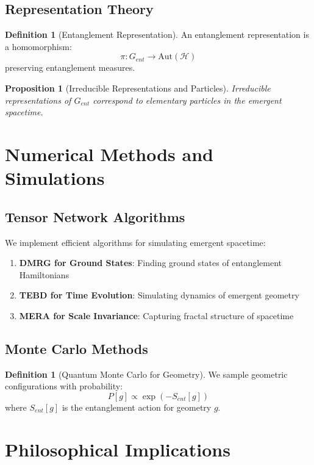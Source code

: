 \documentclass[12pt,a4paper]{article}
\newcommand{\Hilb}{\mathcal{H}}
\theoremstyle{plain}
\newtheorem{proposition}[theorem]{Proposition}
\theoremstyle{definition}
\newtheorem{definition}[theorem]{Definition}
\theoremstyle{remark}
\begin{document}
\subsection{Representation Theory}

\begin{definition}[Entanglement Representation]
An entanglement representation is a homomorphism:
\[\pi: G_{ent} \to \text{Aut}(\Hilb)\]
preserving entanglement measures.
\end{definition}

\begin{proposition}[Irreducible Representations and Particles]
Irreducible representations of $G_{ent}$ correspond to elementary particles in the emergent spacetime.
\end{proposition}

\section{Numerical Methods and Simulations}

\subsection{Tensor Network Algorithms}

We implement efficient algorithms for simulating emergent spacetime:

\begin{enumerate}
\item \textbf{DMRG for Ground States}: Finding ground states of entanglement Hamiltonians
\item \textbf{TEBD for Time Evolution}: Simulating dynamics of emergent geometry
\item \textbf{MERA for Scale Invariance}: Capturing fractal structure of spacetime
\end{enumerate}

\subsection{Monte Carlo Methods}

\begin{definition}[Quantum Monte Carlo for Geometry]
We sample geometric configurations with probability:
\[P[g] \propto \exp(-S_{ent}[g])\]
where $S_{ent}[g]$ is the entanglement action for geometry $g$.
\end{definition}

\section{Philosophical Implications}
\end{document}
